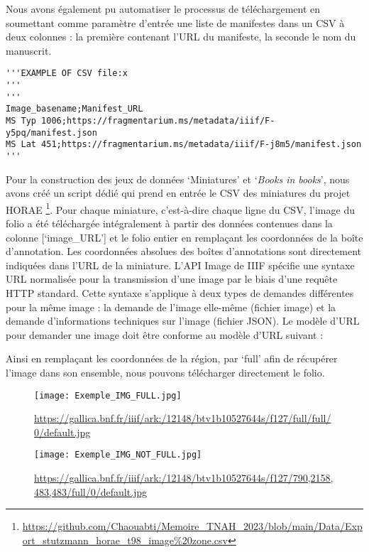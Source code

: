 \documentclass[12pt,twoside]{book}
\begin{document}
\newpage
Nous avons également pu automatiser le processus de téléchargement en soumettant comme paramètre d’entrée une liste de manifestes dans un CSV à deux colonnes : la première contenant l’URL du manifeste, la seconde le nom du manuscrit. \\

\begin{verbatim}
'''EXAMPLE OF CSV file:x
'''
'''
Image_basename;Manifest_URL
MS Typ 1006;https://fragmentarium.ms/metadata/iiif/F-y5pq/manifest.json
MS Lat 451;https://fragmentarium.ms/metadata/iiif/F-j8m5/manifest.json
'''

\end{verbatim}

Pour la construction des jeux de données ‘Miniatures’ et ‘\textit{Books in books}’, nous avons créé un script dédié qui prend en entrée le CSV des miniatures du projet HORAE \footnote{\url{https://github.com/Chaouabti/Memoire\_TNAH\_2023/blob/main/Data/Export\_stutzmann\_horae\_t98\_image\%20zone.csv}}. Pour chaque miniature, c’est-à-dire chaque ligne du CSV, l’image du folio a été téléchargée intégralement à partir des données contenues dans la colonne [‘image\_URL’] et le folio entier en remplaçant les coordonnées de la boîte d’annotation. Les coordonnées absolues des boîtes d’annotations sont directement indiquées dans l’URL de la miniature. L’API Image de IIIF spécifie une syntaxe URL normalisée pour la transmission d'une image par le biais d'une requête HTTP standard. Cette syntaxe s'applique à deux types de demandes différentes pour la même image : la demande de l'image elle-même (fichier image) et la demande d'informations techniques sur l'image (fichier JSON). Le modèle d'URL pour demander une image doit être conforme au modèle d'URL suivant :
 
\begin{center}
\end{center}
 
Ainsi en remplaçant les coordonnées de la région, par ‘full’ afin de récupérer l’image dans son ensemble, nous pouvons télécharger directement le folio.

\newpage
\begin{figure}[ht]
    \centering
    \begin{minipage}[b]{0.45\textwidth}
        \centering
        \texttt{[image: Exemple\_IMG\_FULL.jpg]}
        \caption{\url{https://gallica.bnf.fr/iiif/ark:/12148/btv1b10527644s/f127/full/full/0/default.jpg}}
    \end{minipage}
    \hfill
    \begin{minipage}[b]{0.45\textwidth}
        \centering
        \texttt{[image: Exemple\_IMG\_NOT\_FULL.jpg]}
        \caption{\url{https://gallica.bnf.fr/iiif/ark:/12148/btv1b10527644s/f127/790,2158,483,483/full/0/default.jpg}}
    \end{minipage}
\end{figure}
\end{document}
